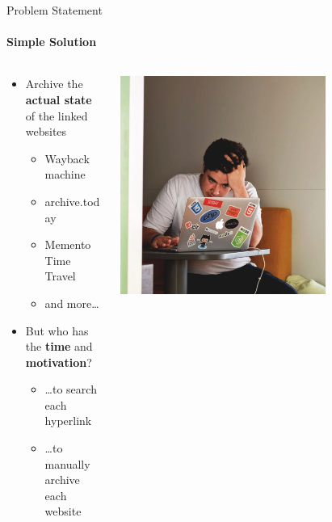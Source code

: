 \documentclass[
    ngerman,%
    authorontitle=true,
]{bfhbeamer}
\begin{document}
	
	

    \begin{frame}{Problem Statement}
        \framesubtitle{Simple Solution}
        \begin{columns} %
            \begin{column}{0.5\textwidth} %
                \begin{itemize}
                    \item Archive the \textbf{actual state} of the linked websites
                    \begin{itemize}
                        \item Wayback machine
                        \item archive.today
                        \item Memento Time Travel
                        \item and more…
                    \end{itemize}
                    \item But who has the \textbf{time} and \textbf{motivation}?
                    \begin{itemize}
                        \item \ldots to search each hyperlink
                        \item \ldots to manually archive each website
                    \end{itemize}
                \end{itemize}
            \end{column}
            \begin{column}{0.4\textwidth} %
                \begin{center}
                    \includegraphics[width=0.7\textwidth]{pictures/frustrated}
                \end{center}
            \end{column}
        \end{columns}
    \end{frame}
\end{document}
